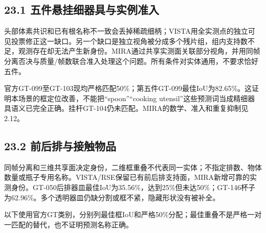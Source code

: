 \documentclass[UTF8,fontset=fandol]{ctexart}
\begin{document}
\subsection*{23.1 五件悬挂细器具与实例准入}

头部体素共识和已有根名称不一致会丢掉稀疏细柄；VISTA用全实测点的独立可见投票修正这一缺口。另一个缺口是独立视角被分成多个残片组，组内支持数不足，观测存在却无法产生新身份。MIRA通过共享实测面关联部分视角，并用同帧分离否决与质量/帧数联合准入处理这个问题。所有条件对实体通用，不要求恰好五件。



官方GT-099至GT-103现均严格匹配50\%；第五件GT-099最佳IoU为82.65\%。这证明本场景的框定位改善，不能把“spoon”“cooking utensil”这些预测词当成精细器具语义已完全正确。挂杆GT-104仍未匹配。MIRA的数学、准入和重复抑制见2.12。



\subsection*{23.2 前后排与接触物品}

同帧分离和三维共享面决定身份，二维框重叠不代表同一实体；不指定排数、物体数量或瓶子专用名称。VISTA/RSE保留已有前后排支持面，MIRA新增可靠的实测身份。GT-050后排器皿最佳IoU为35.56\%，达到25\%但未达50\%；GT-146杯子为62.96\%。多个透明器皿仍缺分割或框不紧，隐藏形状没有被补全。



以下使用官方GT类别，分别列最佳框IoU和严格50\%分配；最佳重叠不是严格一对一匹配的替代，也不证明预测名称正确。
\end{document}
